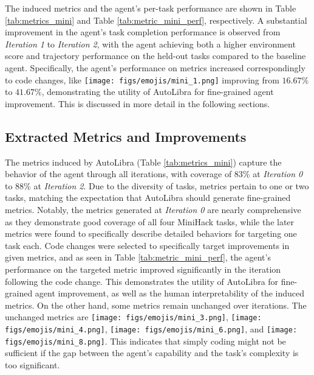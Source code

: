 

\begin{flushleft}

The induced metrics and the agent's per-task performance are shown in Table \ref{tab:metrics_mini} and Table \ref{tab:metric_mini_perf}, respectively. A substantial improvement in the agent's task completion performance is observed from \emph{Iteration 1} to \emph{Iteration 2}, with the agent achieving both a higher environment score and trajectory performance on the held-out tasks compared to the baseline agent. Specifically, the agent's performance on metrics increased correspondingly to code changes, like \texttt{[image: figs/emojis/mini\_1.png]} improving from $16.67\%$ to $41.67\%$, demonstrating the utility of AutoLibra for fine-grained agent improvement. This is discussed in more detail in the following sections.

\subsection{Extracted Metrics and Improvements}
The metrics induced by AutoLibra (Table \ref{tab:metrics_mini}) capture the behavior of the agent through all iterations, with coverage of 83\% at \emph{Iteration 0} to 88\% at \emph{Iteration 2}. Due to the diversity of tasks, metrics pertain to one or two tasks, matching the expectation that AutoLibra should generate fine-grained metrics. Notably, the metrics generated at \emph{Iteration 0} are nearly comprehensive as they demonstrate good coverage of all four MiniHack tasks, while the later metrics were found to specifically describe detailed behaviors for targeting one task each. Code changes were selected to specifically target improvements in given metrics, and as seen in Table \ref{tab:metric_mini_perf}, the agent's performance on the targeted metric improved significantly in the iteration following the code change. This demonstrates the utility of AutoLibra for fine-grained agent improvement, as well as the human interpretability of the induced metrics. On the other hand, some metrics remain unchanged over iterations. The unchanged metrics are \texttt{[image: figs/emojis/mini\_3.png]}, \texttt{[image: figs/emojis/mini\_4.png]}, \texttt{[image: figs/emojis/mini\_6.png]}, and \texttt{[image: figs/emojis/mini\_8.png]}. This indicates that simply coding might not be sufficient if the gap between the agent's capability and the task's complexity is too significant.


\end{flushleft}
